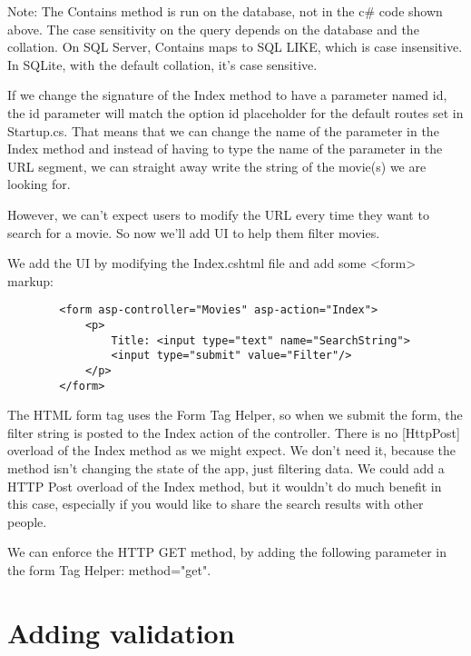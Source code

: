 \documentclass{report}
\begin{document}
    Note: The Contains method is run on the database, not in the c# code shown above.
    The case sensitivity on the query depends on the database and the collation. On SQL
    Server, Contains maps to SQL LIKE, which is case insensitive. In SQLite, with the
    default collation, it's case sensitive.

    If we change the signature of the Index method to have a parameter named id, the id
    parameter will match the option {id} placeholder for the default routes set in Startup.cs.
    That means that we can change the name of the parameter in the Index method
    and instead of having to type the name of the parameter in the URL segment, we can straight
    away write the string of the movie(s) we are looking for.

    However, we can't expect users to modify the URL every time they want to search for a movie.
    So now we'll add UI to help them filter movies.

    We add the UI by modifying the Index.cshtml file and add some <form> markup:
    \lstset{style=sharpc}
    \begin{lstlisting}
        <form asp-controller="Movies" asp-action="Index">
            <p>
                Title: <input type="text" name="SearchString">
                <input type="submit" value="Filter"/>
            </p>
        </form>
    \end{lstlisting}

    The HTML form tag uses the Form Tag Helper, so when we submit the form,
    the filter string is posted to the Index action of the controller.
    There is no [HttpPost] overload of the Index method as we might expect.
    We don't need it, because the method isn't changing the state of the app,
    just filtering data. We could add a HTTP Post overload of the Index method,
    but it wouldn't do much benefit in this case, especially if you would
    like to share the search results with other people.

    We can enforce the HTTP GET method, by adding the following parameter in
    the form Tag Helper: method="get".

    \chapter{Adding validation}
\end{document}
